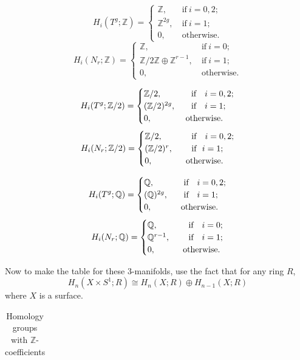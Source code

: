 \documentclass[a4paper, 12pt]{article}
\begin{document}
\begin{solution}
\begin{enumerate}[(a)]
\begin{multicols}{2}
\[H_i(T^g;\mathbb{Z})=\begin{cases}
    \mathbb{Z},&\ \text{if}\ i=0,2;\\
    \mathbb{Z}^{2g},&\ \text{if}\ i=1;\\ 
    0,&\ \text{otherwise}. 
\end{cases}\]
\[H_i(N_r;\mathbb{Z})=\begin{cases}
    \mathbb{Z},&\ \text{if}\ i=0;\\ 
    \mathbb{Z}/2 \mathbb{Z}\oplus \mathbb{Z}^{r-1},&\ \text{if}\ i=1;\\ 
    0,&\ \text{otherwise}.
\end{cases}\]
\end{multicols}
\begin{multicols}{2}
\noindent 
\[H_i(T^g;\mathbb{Z}/2)=\begin{cases}
	\mathbb{Z}/2,&\ \ \ \text{if}\ \ \ i=0,2;\\ 
	(\mathbb{Z}/2)^{2g},&\ \ \ \text{if}\ \  \ i=1;\\ 
	0,&\ \text{otherwise}.
\end{cases}\]
\[H_i(N_r;\mathbb{Z}/2)=\begin{cases}
	\mathbb{Z}/2,&\ \ \ \ \text{if}\ \ \ i=0,2;\\ 
	(\mathbb{Z}/2)^r,&\ \ \ \ \text{if}\ \  i=1;\\ 
	0,&\ \ \text{otherwise}.
\end{cases}\]
\end{multicols}
\begin{multicols}{2}
\noindent 
\[H_i(T^g;\mathbb{Q})=\begin{cases}
	\mathbb{Q},&\ \ \ \text{if}\ \  \ i=0,2;\\ 
	(\mathbb{Q})^{2g},&\ \ \ \text{if}\ \  \ i=1;\\ 
	0,&\ \ \text{otherwise}.
\end{cases}\]
\[H_i(N_r;\mathbb{Q})=\begin{cases}
	\mathbb{Q},&\ \ \ \ \text{if}\ \  \ i=0;\\ 
	\mathbb{Q}^{r-1},&\ \ \ \ \text{if}\ \ \ i=1;\\ 
	0,&\ \ \text{otherwise}.
\end{cases}\]
\end{multicols}
Now to make the table for these 3-manifolds, use the fact that for any ring \(R\), 
\[H_n(X\times S^1;R)\cong H_n(X;R)\oplus H_{n-1}(X;R)\]
where \(X\) is a surface. 
\begin{table}[!h]
\begin{center}
\caption{Homology groups with \(\mathbb{Z}\)-coefficients}
\vspace{.1cm}
\begin{tabular}{|c||c|c|c|c|c|}

\end{tabular}
\end{center}
\end{table}
\end{enumerate}
\end{solution}
\end{document}

